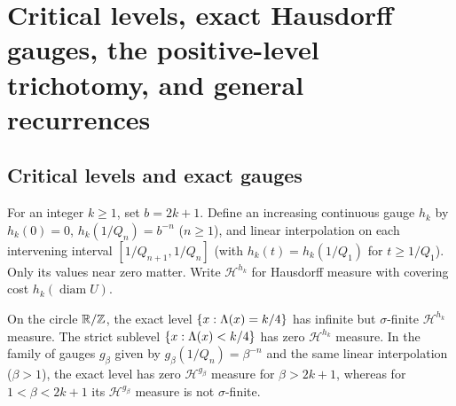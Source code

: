 \section{Critical levels, exact Hausdorff gauges, the positive-level trichotomy, and general recurrences}\label{sec:gauge}

\subsection{Critical levels and exact gauges}

For an integer $k\ge1$, set $b=2k+1$. Define an increasing continuous
gauge $h_k$ by $h_k(0)=0$, $h_k(1/Q_n)=b^{-n}$ ($n\ge1$), and
linear interpolation on each intervening interval $[1/Q_{n+1},1/Q_n]$ (with
$h_k(t)=h_k(1/Q_1)$ for $t\ge1/Q_1$). Only its values near zero matter. Write
$\mathcal H^{h_k}$ for Hausdorff measure with covering cost
$h_k(\operatorname{diam} U)$.

\begin{theorem}\label{thm:gauge}
On the circle $\mathbb{R}/\mathbb{Z}$, the exact level $\{x:\Lambda(x)=k/4\}$ has
infinite but $\sigma$-finite $\mathcal H^{h_k}$ measure.
The strict sublevel $\{x:\Lambda(x)<k/4\}$ has zero $\mathcal H^{h_k}$ measure.
In the family of gauges $g_\beta$ given by $g_\beta(1/Q_n)=\beta^{-n}$
and the same linear interpolation ($\beta>1$), the exact level has zero
$\mathcal H^{g_\beta}$ measure for $\beta>2k+1$, whereas for $1<\beta<2k+1$ its
$\mathcal H^{g_\beta}$ measure is not $\sigma$-finite.
\end{theorem}

